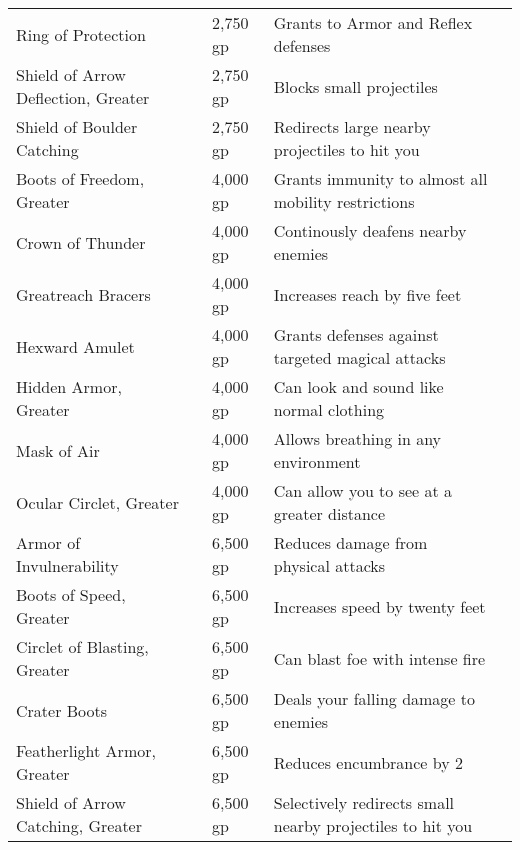 \begin{longtabuwrapper}
\begin{longtabu}{l l l X l}
Ring of Protection &  & 2,750 gp & Grants  to Armor and Reflex defenses & \pageref{item:Ring of Protection} \\
Shield of Arrow Deflection, Greater &  & 2,750 gp & Blocks small projectiles & \pageref{item:Shield of Arrow Deflection, Greater} \\
Shield of Boulder Catching &  & 2,750 gp & Redirects large nearby projectiles to hit you & \pageref{item:Shield of Boulder Catching} \\
Boots of Freedom, Greater &  & 4,000 gp & Grants immunity to almost all mobility restrictions & \pageref{item:Boots of Freedom, Greater} \\
Crown of Thunder &  & 4,000 gp & Continously deafens nearby enemies & \pageref{item:Crown of Thunder} \\
Greatreach Bracers &  & 4,000 gp & Increases reach by five feet & \pageref{item:Greatreach Bracers} \\
Hexward Amulet &  & 4,000 gp & Grants  defenses against targeted magical attacks & \pageref{item:Hexward Amulet} \\
Hidden Armor, Greater &  & 4,000 gp & Can look and sound like normal clothing & \pageref{item:Hidden Armor, Greater} \\
Mask of Air &  & 4,000 gp & Allows breathing in any environment & \pageref{item:Mask of Air} \\
Ocular Circlet, Greater &  & 4,000 gp & Can allow you to see at a greater distance & \pageref{item:Ocular Circlet, Greater} \\
Armor of Invulnerability &  & 6,500 gp & Reduces damage from physical attacks & \pageref{item:Armor of Invulnerability} \\
Boots of Speed, Greater &  & 6,500 gp & Increases speed by twenty feet & \pageref{item:Boots of Speed, Greater} \\
Circlet of Blasting, Greater &  & 6,500 gp & Can blast foe with intense fire & \pageref{item:Circlet of Blasting, Greater} \\
Crater Boots &  & 6,500 gp & Deals your falling damage to enemies & \pageref{item:Crater Boots} \\
Featherlight Armor, Greater &  & 6,500 gp & Reduces encumbrance by 2 & \pageref{item:Featherlight Armor, Greater} \\
Shield of Arrow Catching, Greater &  & 6,500 gp & Selectively redirects small nearby projectiles to hit you & \pageref{item:Shield of Arrow Catching, Greater} \\

\end{longtabu}
\end{longtabuwrapper}
